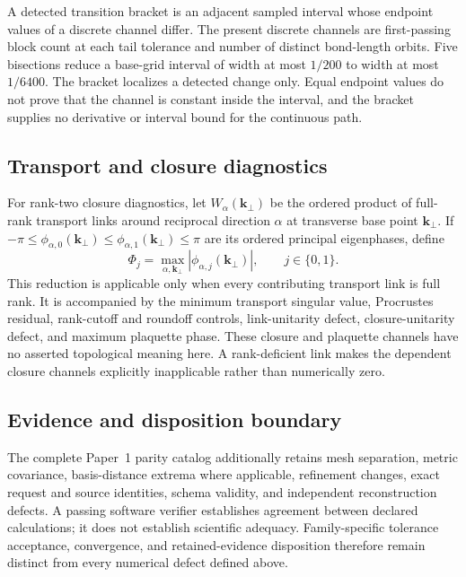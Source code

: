 A detected transition bracket is an adjacent sampled interval whose endpoint values of
a discrete channel differ. The present discrete channels are first-passing block count
at each tail tolerance and number of distinct bond-length orbits. Five bisections reduce
a base-grid interval of width at most $1/200$ to width at most $1/6400$. The bracket
localizes a detected change only. Equal endpoint values do not prove that the channel is
constant inside the interval, and the bracket supplies no derivative or interval bound
for the continuous path.

\subsection{Transport and closure diagnostics}

For rank-two closure diagnostics, let $W_\alpha(\mathbf k_\perp)$ be the ordered product
of full-rank transport links around reciprocal direction $\alpha$ at transverse base
point $\mathbf k_\perp$. If
$-\pi\le\phi_{\alpha,0}(\mathbf k_\perp)\le
\phi_{\alpha,1}(\mathbf k_\perp)\le\pi$ are its ordered principal eigenphases, define
\begin{equation}
 \Phi_j=\max_{\alpha,\mathbf k_\perp}
 |\phi_{\alpha,j}(\mathbf k_\perp)|,
 \qquad j\in\{0,1\}.
 \label{eq:multidimensional-closure-phase-reduction}
\end{equation}
This reduction is applicable only when every contributing transport link is full rank.
It is accompanied by the minimum transport singular value, Procrustes residual,
rank-cutoff and roundoff controls, link-unitarity defect, closure-unitarity defect, and
maximum plaquette phase. These closure and plaquette channels have no asserted
topological meaning here. A rank-deficient link makes the dependent closure channels
explicitly inapplicable rather than numerically zero.

\subsection{Evidence and disposition boundary}

The complete Paper~1 parity catalog additionally retains mesh separation, metric
covariance, basis-distance extrema where applicable, refinement changes, exact request
and source identities, schema validity, and independent reconstruction defects. A
passing software verifier establishes agreement between declared calculations; it does
not establish scientific adequacy. Family-specific tolerance acceptance, convergence,
and retained-evidence disposition therefore remain distinct from every numerical defect
defined above.
